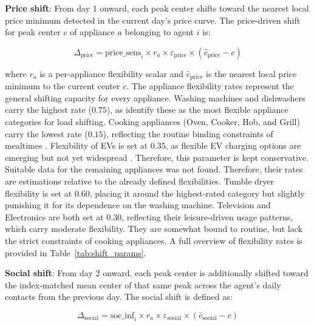 \documentclass[11pt, a4paper]{article}
\begin{document}
\medskip

\textbf{Price shift}: From day 1 onward, each peak center shifts toward the nearest local price minimum detected in the current day's price curve. The price-driven shift for peak center $c$ of appliance $a$ belonging to agent $i$ is:

\begin{equation} \label{eq:price_shift}
    \Delta_{\text{price}} = \text{price\_sens}_i \times r_a \times \varepsilon_{\text{price}} \times (\hat{c}_{\text{price}} - c)
\end{equation}

\noindent where $r_a$ is a per-appliance flexibility scalar and $\hat{c}_{\text{price}}$ is the nearest local price minimum to the current center $c$. The appliance flexibility rates represent the general shifting capacity for every appliance. Washing machines and dishwashers carry the highest rate ($0.75$), as \textcite{berg_occupant-driven_2024} identify these as the most flexible appliance categories for load shifting. Cooking appliances (Oven, Cooker, Hob, and Grill) carry the lowest rate ($0.15$), reflecting the routine binding constraints of mealtimes \autocite{berg_occupant-driven_2024}. Flexibility of EVs is set at $0.35$, as flexible EV charging options are emerging but not yet widespread \autocite{sorensen_analysis_2021}. Therefore, this parameter is kept conservative. Suitable data for the remaining appliances was not found. Therefore, their rates are estimations relative to the already defined flexibilities. Tumble dryer flexibility is set at $0.60$, placing it around the highest-rated category but slightly punishing it for its dependence on the washing machine. Television and Electronics are both set at $0.30$, reflecting their leisure-driven usage patterns, which carry moderate flexibility. They are somewhat bound to routine, but lack the strict constraints of cooking appliances. A full overview of flexibility rates is provided in Table~\ref{tab:shift_params}.
\medskip

\textbf{Social shift}: From day 2 onward, each peak center is additionally shifted toward the index-matched mean center of that same peak across the agent's daily contacts from the previous day. The social shift is defined as:

\begin{equation} \label{eq:social_shift}
    \Delta_{\text{social}} = \text{soc\_inf}_i \times r_a \times \varepsilon_{\text{social}} \times (\bar{c}_{\text{social}} - c)
\end{equation}
\end{document}
